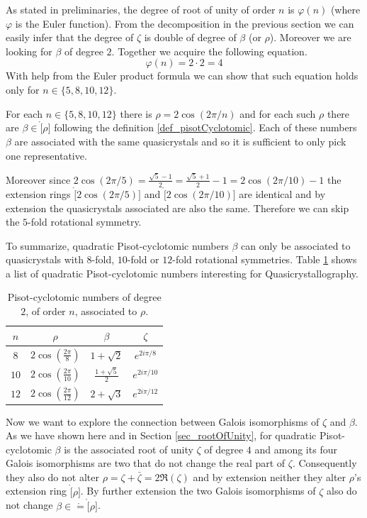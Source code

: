 \documentclass[text.tex]{subfiles}
\begin{document}
As stated in preliminaries, the degree of root of unity of order $n$ is $\varphi(n)$ (where $\varphi$ is the Euler function). From the decomposition in the previous section we can easily infer that the degree of $\zeta$ is double of degree of $\beta$ (or $\rho$). Moreover we are looking for $\beta$ of degree $2$. Together we acquire the following equation. 
$$\varphi(n) = 2\cdot 2 = 4$$
With help from the Euler product formula we can show that such equation holds only for $n\in\{5,8,10,12\}$. 

For each $n\in\{5,8,10,12\}$ there is $\rho = 2\cos\left(2\pi/n\right)$ and for each such $\rho$ there are $\beta \in \ring[\rho]$ following the definition \ref{def_pisotCyclotomic}. Each of these numbers $\beta$ are associated with the same quasicrystals and so it is sufficient to only pick one representative. 

Moreover since $2\cos\left(2\pi/5\right) = \frac{\sqrt{5}-1}{2} = \frac{\sqrt{5}+1}{2} -1 = 2\cos\left(2\pi/10\right) - 1$ the extension rings $\ring[2\cos\left(2\pi/5\right)]$ and $\ring[2\cos\left(2\pi/10\right)]$ are identical and by extension the quasicrystals associated are also the same. Therefore we can skip the $5$-fold rotational symmetry. 

To summarize, quadratic Pisot-cyclotomic numbers $\beta$ can only be associated to quasicrystals with $8$-fold, $10$-fold or $12$-fold rotational symmetries. Table \ref{tab_quadraticPisotCyclotomic} shows a list of quadratic Pisot-cyclotomic numbers interesting for Quasicrystallography. 

\begin{table}[h!]
\centering
\begin{tabular}{cccc}
$n$ & $\rho$ & $\beta$ & $\zeta$ \\
\hline
$8$  & $2 \cos\left(\frac{2\pi}{8}\right)$  & $ 1+\sqrt{2} $          & $e^{2i\pi/8}$  \\
$10$ & $2 \cos\left(\frac{2\pi}{10}\right)$ & $\frac{1+\sqrt{5}}{2} $ & $e^{2i\pi/10}$ \\
$12$ & $2 \cos\left(\frac{2\pi}{12}\right)$ & $ 2+\sqrt{3} $          & $e^{2i\pi/12}$ \\
\end{tabular}
\caption{Pisot-cyclotomic numbers of degree $2$, of order $n$, associated to $\rho$.}
\label{tab_quadraticPisotCyclotomic}
\end{table}

Now we want to explore the connection between Galois isomorphisms of $\zeta$ and $\beta$. As we have shown here and in Section \ref{sec_rootOfUnity}, for quadratic Pisot-cyclotomic $\beta$ is the associated root of unity $\zeta$ of degree $4$ and among its four Galois isomorphisms are two that do not change the real part of $\zeta$. Consequently they also do not alter $\rho = \zeta +\bar{\zeta} = 2\Re{(\zeta)}$ and by extension neither they alter $\rho$'s extension ring $\ring[\rho]$. By further extension the two Galois isomorphisms of $\zeta$ also do not change $\beta\in\ring=\ring[\rho]$. 
\end{document}
